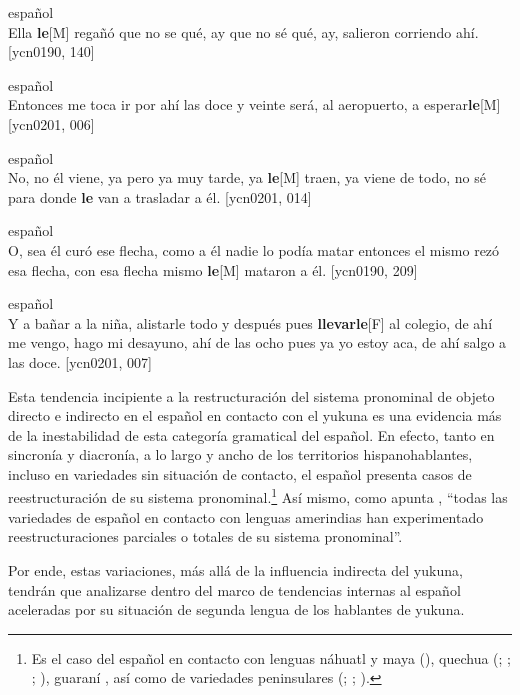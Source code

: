 \documentclass[output=paper]{langscibook}
\begin{document}
\ea
{español}\\
Ella \textbf{le}[M] regañó que no se qué, ay que no sé qué, ay, salieron corriendo ahí. {[ycn0190, 140]}\\
\z

\ea
{español}\\
Entonces me toca ir por ahí las doce y veinte será, al aeropuerto, a esperar\textbf{le}[M] {[ycn0201, 006]}\\
\z

\ea
{español}\\
No, no él viene, ya pero ya muy tarde, ya \textbf{le}[M] traen, ya viene de todo, no sé para donde \textbf{le} van a trasladar a él. {[ycn0201, 014]}\\
\z

\ea
{español}\\
O, sea él curó ese flecha, como a él nadie lo podía matar entonces el mismo rezó esa flecha, con esa flecha mismo \textbf{le}[M] mataron a él. {[ycn0190, 209]}\\
\z

\ea
{español}\\
Y a bañar a la niña, alistarle todo y después pues \textbf{llevarle}[F] al colegio, de ahí me vengo, hago mi desayuno, ahí de las ocho pues ya yo estoy aca, de ahí salgo a las doce. {[ycn0201, 007]}\\
\z

Esta tendencia incipiente a la restructuración del sistema pronominal de objeto directo e indirecto en el español en contacto con el yukuna es una evidencia más de la inestabilidad de esta categoría gramatical del español. En efecto, tanto en sincronía y diacronía, a lo largo y ancho de los territorios hispanohablantes, incluso en variedades sin situación de contacto, el español presenta casos de reestructuración de su sistema pronominal.\footnote{Es el caso del español en contacto con lenguas náhuatl y maya (\citealt{FloresFarfán1999}), quechua (\citealt{Godenzzi1986}; \citealt{Klee1990}; \citealt{DeGranda2001};  \citealt{PalaciosAlcaine2005}), guaraní \citep{DeGranda1996}, así como de variedades peninsulares (\citealt{Landa1995}; \citealt{Fernández-Ordóñez1999};  \citealt{KleinAndreu2000}).} Así mismo, como apunta \citet[267]{PalaciosAlcaine2019}, “todas las variedades de español en contacto con lenguas amerindias han experimentado reestructuraciones parciales o totales de su sistema pronominal”.

Por ende, estas variaciones, más allá de la influencia indirecta del yukuna, tendrán que analizarse dentro del marco de tendencias internas al español aceleradas por su situación de segunda lengua de los hablantes de yukuna. 
\end{document}
